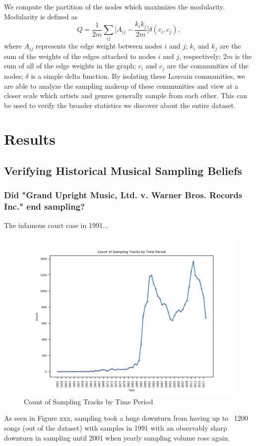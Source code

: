 \documentclass[pageno]{jpaper}
\begin{document}
We compute the partition of the nodes which maximizes the modularity. Modularity is defined as
\begin{equation}
Q={\frac {1}{2m}}\sum \limits _{ij}{\bigg [}A_{ij}-{\frac {k_{i}k_{j}}{2m}}{\bigg ]}\delta (c_{i},c_{j}),
\end{equation} where $A_{ij}$ represents the edge weight between nodes $i$ and $j$;
$k_{i}$ and $k_{j}$ are the sum of the weights of the edges attached to nodes $i$ and $j$, respectively;
$2m$ is the sum of all of the edge weights in the graph; 
$c_{i}$ and $c_{j}$ are the communities of the nodes;
$\delta$ is a simple delta function. By isolating these Louvain communities, we are able to analyze the sampling makeup of these communities and view at a closer scale which artists and genres generally sample from each other. This can be used to verify the broader statistics we discover about the entire dataset.  
\section{Results}
\subsection{Verifying Historical Musical Sampling Beliefs}
\subsubsection{Did "Grand Upright Music, Ltd. v. Warner Bros. Records Inc." end sampling?}
The infamous court case in 1991...
\begin{figure}[H]
\includegraphics{TimePeriods/samplingTimePeriod}
\caption{Count of Sampling Tracks by Time Period}
\centering
\end{figure}
As seen in Figure xxx, sampling took a huge downturn from having up to ~1200 songs (out of the dataset) with samples in 1991 with an observably sharp downturn in sampling until 2001 when yearly sampling volume rose again.
\end{document}
